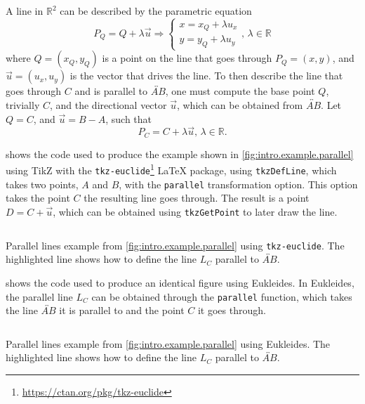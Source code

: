 A line in $\mathbb{R}^2$ can be described by the parametric equation
\begin{equation}\label{eq:line.parametric.2}
  P_Q = Q + \lambda\vec{u} \Rightarrow
  \begin{cases}
    x = x_Q + \lambda u_x \\
    y = y_Q + \lambda u_y
  \end{cases},\,\lambda \in \mathbb{R}
\end{equation}
where $Q = (x_Q, y_Q)$ is a point on the line that goes through $P_Q = (x, y)$,
and $\vec{u} = (u_x, u_y)$ is the vector that drives the line.  To then describe
the line that goes through $C$ and is parallel to $\overleftrightarrow{AB}$, one
must compute the base point $Q$, trivially $C$, and the directional vector
$\vec{u}$, which can be obtained from $\overleftrightarrow{AB}$.  Let $Q = C$,
and $\vec{u} = B - A$, such that
\[ P_C = C + \lambda \vec{u},\,\lambda \in \mathbb{R}. \]

 shows the code used to produce the
example shown in \cref{fig:intro.example.parallel} using \acs{TikZ} with the
\texttt{tkz-euclide}\footnote{\url{https://ctan.org/pkg/tkz-euclide}} \LaTeX{}
package, using \texttt{tkzDefLine}, which takes two points, $A$ and $B$, with
the \texttt{parallel} transformation option.  This option takes the point $C$
the resulting line goes through.  The result is a point $D = C + \vec{u}$, which
can be obtained using \texttt{tkzGetPoint} to later draw the line. 

\begin{listing}[htb]
  \inputminted[highlightlines=3]{latex}{tikz/ex-parallel.tikz}
  \caption[Parallel lines example using \texttt{tkz-euclide}]{
    Parallel lines example from \cref{fig:intro.example.parallel} using
    \texttt{tkz-euclide}.  The highlighted line shows how to define the line
    $L_C$ parallel to $\overleftrightarrow{AB}$.}%
  \label{lst:intro.example.parallel.tikz}
\end{listing}

 shows the code used to produce an
identical figure using Eukleides.  In Eukleides, the parallel line $L_C$ can be
obtained through the \texttt{parallel} function, which takes the line
$\overleftrightarrow{AB}$ it is parallel to and the point $C$ it goes through.

\begin{listing}[htb]
  \inputminted[highlightlines=3]{text}{euk/ex-parallel.euk}
  \caption[Parallel lines example using Eukleides]{
    Parallel lines example from \cref{fig:intro.example.parallel} using
    Eukleides.  The highlighted line shows how to define the line $L_C$
    parallel to $\overleftrightarrow{AB}$.}%
  \label{lst:intro.example.parallel.euk}
\end{listing}

